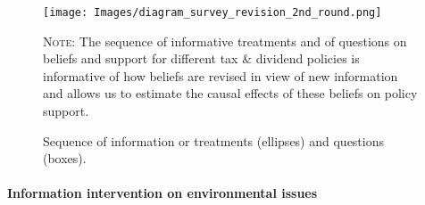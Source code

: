 \documentclass[12pt]{article} %
\begin{document}
\begin{figure}[ht!]
\centering
\texttt{[image: Images/diagram\_survey\_revision\_2nd\_round.png]}
\parbox[t]{0.89\columnwidth}{
\caption{Sequence of information or treatments (ellipses) and questions (boxes).}
\linespread{1.2}\selectfont \footnotesize{\textsc{Note:} The sequence of informative treatments and of questions on beliefs and support for different tax \& dividend policies is informative of how beliefs are revised in view of new information and allows us to estimate the causal effects of these beliefs on policy support. }\label{fig:survey}} %
\end{figure}




\paragraph{Information intervention on environmental issues}

\end{document}
